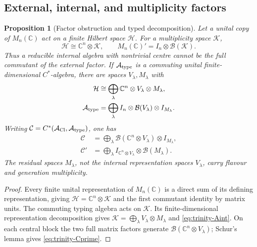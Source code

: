 \documentclass[11pt]{article}
\numberwithin{equation}{section}
\newtheorem{proposition}[theorem]{Proposition}
\theoremstyle{definition}
\theoremstyle{remark}
\newcommand{\C}{\mathbb C}
\newcommand{\A}{\mathcal A}
\newcommand{\Hh}{\mathcal H}
\begin{document}
\subsection{External, internal, and multiplicity factors}
\label{sec:obstruction}

\begin{proposition}[Factor obstruction and typed decomposition]
\label{thm:trinity}
Let a unital copy of $M_n(\C)$ act on a finite Hilbert space $\Hh$.
For a multiplicity space $\mathcal K$,
\begin{equation}
 \Hh\cong\C^n\otimes\mathcal K,\qquad
 M_n(\C)'=I_n\otimes\mathcal B(\mathcal K).
 \label{eq:factor-commutant}
\end{equation}
Thus a reducible internal algebra with nontrivial centre cannot be the full
commutant of the external factor.  If $\A_{\rm type}$ is a commuting unital
finite-dimensional $C^*$-algebra, there are spaces $V_\lambda,M_\lambda$ with
\begin{align}
 \Hh&\cong\bigoplus_\lambda\C^n\otimes V_\lambda\otimes M_\lambda,
 \label{eq:trinity-H}\\
 \A_{\rm type}&=\bigoplus_\lambda I_n\otimes\mathcal B(V_\lambda)
                         \otimes I_{M_\lambda}.
 \label{eq:trinity-Aint}
\end{align}
Writing $\mathcal C=C^*(\A_{\rm Cl},\A_{\rm type})$, one has
\begin{align}
 \mathcal C&=\bigoplus_\lambda\mathcal B(\C^n\otimes V_\lambda)
                         \otimes I_{M_\lambda},\label{eq:trinity-C}\\
 \mathcal C'&=\bigoplus_\lambda I_{\C^n\otimes V_\lambda}
                         \otimes\mathcal B(M_\lambda).
 \label{eq:trinity-Cprime}
\end{align}
The residual spaces $M_\lambda$, not the internal representation spaces
$V_\lambda$, carry flavour and generation multiplicity.
\end{proposition}
\begin{proof}
Every finite unital representation of $M_n(\C)$ is a direct sum of its
defining representation, giving $\Hh=\C^n\otimes\mathcal K$ and the first
commutant identity by matrix units.  The commuting typing algebra acts on
$\mathcal K$.  Its finite-dimensional representation decomposition gives
$\mathcal K=\bigoplus_\lambda V_\lambda\otimes M_\lambda$ and
\eqref{eq:trinity-Aint}.  On each central block the two full matrix factors
generate $\mathcal B(\C^n\otimes V_\lambda)$; Schur's lemma gives
\eqref{eq:trinity-Cprime}.
\end{proof}
\end{document}
